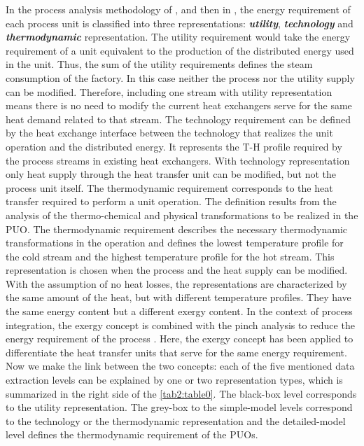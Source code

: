 In the process analysis methodology of \citet{brown2005dual}, \citet{muller2007energy} and then in \citet{Perin-Levasseur2009}, the energy requirement of each process unit is classified into three representations: \textbf{\textit{utility}}, \textbf{\textit{technology}} and \textbf{\textit{thermodynamic}} representation. The utility requirement would take the energy requirement of a unit equivalent to the production of the distributed energy used in the unit. Thus, the sum of the utility requirements defines the steam consumption of the factory. In this case neither the process nor the utility supply can be modified. Therefore, including one stream with utility representation means there is no need to modify the current heat exchangers serve for the same heat demand related to that stream. The technology requirement can be defined by the heat exchange interface between the technology that realizes the unit operation and the distributed energy. It represents the T-H profile required by the process streams in existing heat exchangers. With technology representation only heat supply through the heat transfer unit can be modified, but not the process unit itself. The thermodynamic requirement corresponds to the heat transfer required to perform a unit operation. The definition results from the analysis of the thermo-chemical and physical transformations to be realized in the PUO. The thermodynamic requirement describes the necessary thermodynamic transformations in the operation and defines the lowest temperature profile for the cold stream and the highest temperature profile for the hot stream. This representation is chosen when the process and the heat supply can be modified. With the assumption of no heat losses, the representations are characterized by the same amount of the heat, but with different temperature profiles. They have the same energy content but a  different exergy content.  In the context of process integration, the exergy concept is combined with the pinch analysis to reduce the energy requirement of the process \cite{LENI-ARTICLE-1996-002}. Here, the exergy concept has been applied to differentiate the heat transfer units that serve for the same energy requirement. Now we make the link between the two concepts: each of the five mentioned data extraction levels can be explained by one or two representation types, which is summarized in the right side of the \cref{tab2:table0}. The black-box level corresponds to the utility representation. The grey-box to the simple-model levels correspond to the technology or the thermodynamic representation and the detailed-model level defines the thermodynamic requirement of the PUOs. 


